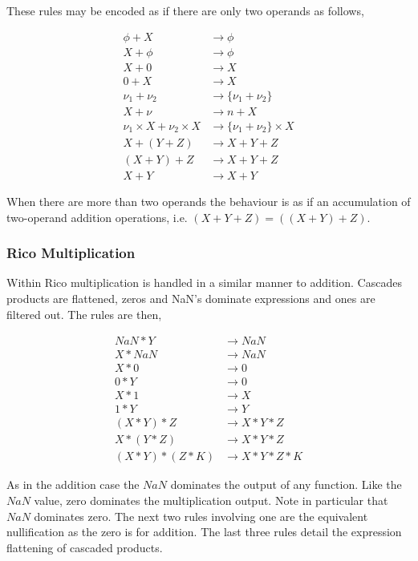 These rules may be encoded as if there are only two operands as follows,

\begin{align*}
\phi + X                   &\rightarrow \phi\\
X + \phi                   &\rightarrow \phi\\
X + 0                      &\rightarrow X\\
0 + X                      &\rightarrow X\\
\nu_1 + \nu_2              &\rightarrow \{\nu_1+\nu_2\}\\
X + \nu                    &\rightarrow n + X\\
\nu_1 \times X + \nu_2 \times X  &\rightarrow \{\nu_1 + \nu_2\} \times X\\
X + (Y + Z)                &\rightarrow X + Y + Z\\
(X + Y) + Z                &\rightarrow X + Y + Z\\
X + Y                      &\rightarrow X + Y
\end{align*}

When there are more than two operands the behaviour is as if an accumulation of two-operand addition operations, i.e. $(X+Y+Z) = ((X+Y)+Z)$.

\subsubsection{Rico Multiplication}
Within Rico multiplication is handled in a similar manner to addition. Cascades products are flattened, zeros and NaN's dominate expressions and ones are filtered out. The rules are then,

\begin{align*}
NaN*Y             &\rightarrow NaN\\
X*NaN             &\rightarrow NaN\\
X*0               &\rightarrow 0\\
0*Y               &\rightarrow 0\\
X*1               &\rightarrow X\\
1*Y               &\rightarrow Y\\
(X*Y)*Z           &\rightarrow X*Y*Z\\
X*(Y*Z)           &\rightarrow X*Y*Z\\
(X*Y)*(Z*K)       &\rightarrow X*Y*Z*K
\end{align*}

As in the addition case the $NaN$ dominates the output of any function. Like the $NaN$ value, zero dominates the multiplication output. Note in particular that $NaN$ dominates zero. The next two rules involving one are the equivalent nullification as the zero is for addition. The last three rules detail the expression flattening of cascaded products. 

